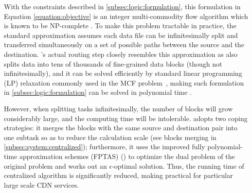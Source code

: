 With the constraints described in \Section\ref{subsec:logic:formulation}, this formulation in Equation \ref{equation:objective} is an integer multi-commodity flow algorithm which is known to be NP-complete \cite{garg1997primal}.
To make this problem tractable in practice,
the standard approximation assumes each data file can be infinitesimally split and transferred simultaneously on a set of possible paths between the source and the destination.
\name's actual routing step closely resembles this approximation as \name also splits data into tens of thousands of fine-grained data blocks (though not infinitesimally), and it can be solved efficiently by standard linear programming (LP) relaxation commonly used in the MCF problem~\cite{garg2007faster},
making such formulation in \Section\ref{subsec:logic:formulation} can be solved in polynomial time \cite{reed2012traffic}.

However, when splitting tasks infinitesimally, the number of blocks will grow considerably large, and the computing time will be intolerable. \name adopts two coping strategies: it merges the blocks with the same source and destination pair into one subtask so as to reduce the calculation scale (see blocks merging in \Section\ref{subsec:system:centralized}); furthermore, it uses the improved fully polynomial-time approximation schemes (FPTAS) (\cite{fleischer2000approximating}) to optimize the dual problem of the original problem and works out an $\epsilon$-optimal solution. Thus, the running time of centralized algorithm is significantly reduced, making \name practical for particular large scale CDN services.
